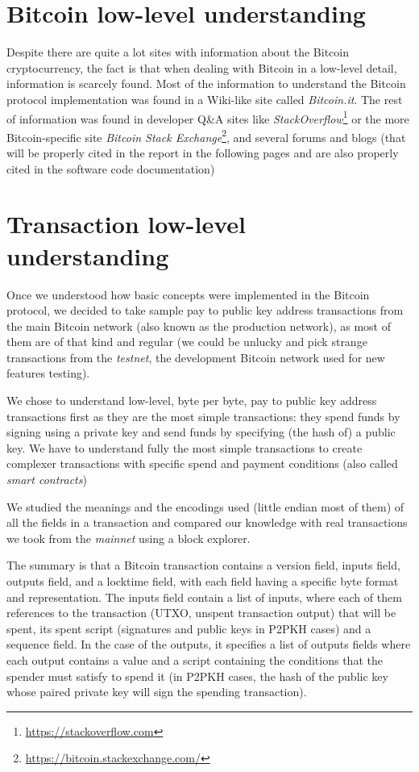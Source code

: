 \section{Bitcoin low-level understanding}
Despite there are quite a lot sites with information about the Bitcoin cryptocurrency, the fact is that when dealing with Bitcoin in a low-level detail, information is scarcely found. Most of the information to understand the Bitcoin protocol implementation was found in a Wiki-like site called \textit{Bitcoin.it}\cite{bitcoin_wiki:online}. The rest of information was found in developer Q\&A sites like \textit{StackOverflow}\footnote{\url{https://stackoverflow.com}} or the more Bitcoin-specific site \textit{Bitcoin Stack Exchange}\footnote{\url{https://bitcoin.stackexchange.com/}}, and several forums and blogs (that will be properly cited in the report in the following pages and are also properly cited in the software code documentation)

\section{Transaction low-level understanding}
Once we understood how basic concepts were implemented in the Bitcoin protocol, we decided to take sample pay to public key address transactions from the main Bitcoin network (also known as the production network), as most of them are of that kind and regular (we could be unlucky and pick strange transactions from the \textit{testnet}, the development Bitcoin network used for new features testing).

We chose to understand low-level, byte per byte, pay to public key address transactions first as they are the most simple transactions: they spend funds by signing using a private key and send funds by specifying (the hash of) a public key. We have to understand fully the most simple transactions to create complexer transactions with specific spend and payment conditions (also called \textit{smart contracts})

We studied the meanings and the encodings used (little endian most of them) of all the fields in a transaction and compared our knowledge with real transactions we took from the \textit{mainnet} using a block explorer\cite{webbtc:online}\cite{blockr_btc:online}.

The summary is that a Bitcoin transaction contains a version field, inputs field, outputs field, and a locktime field, with each field having a specific byte format and representation. The inputs field contain a list of inputs, where each of them references to the transaction (UTXO, unspent transaction output) that will be spent, its spent script (signatures and public keys in P2PKH cases) and a sequence field. In the case of the outputs, it specifies a list of outputs fields where each output contains a value and a script containing the conditions that the spender must satisfy to spend it (in P2PKH cases, the hash of the public key whose paired private key will sign the spending transaction).


